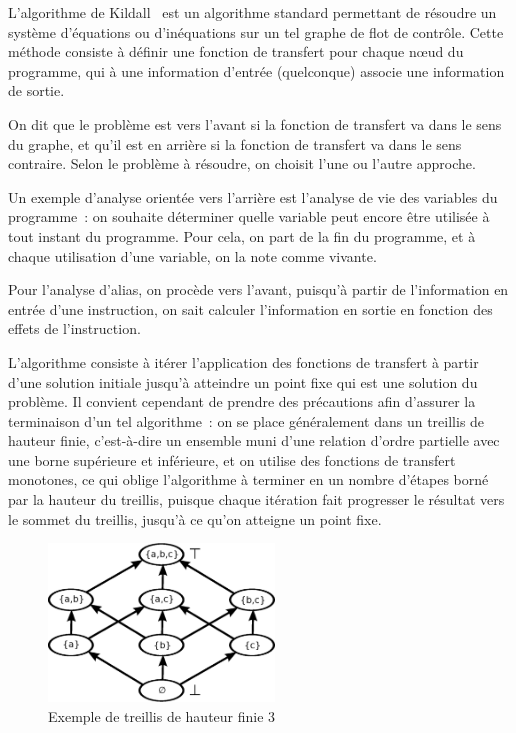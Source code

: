 \documentclass{article}
\begin{document}
L'algorithme de Kildall~\cite{Kildall-73} est un algorithme standard permettant
de résoudre un système d'équations ou d'inéquations sur un tel graphe de flot
de contrôle.  Cette méthode consiste à définir une fonction de transfert pour
chaque nœud du programme, qui à une information d'entrée (quelconque) associe
une information de sortie.

On dit que le problème est vers l'avant si la fonction de transfert va dans le
sens du graphe, et qu'il est en arrière si la fonction de transfert va dans le
sens contraire. Selon le problème à résoudre, on choisit l'une ou l'autre
approche.

Un exemple d'analyse orientée vers l'arrière est l'analyse de vie des variables
du programme~: on souhaite déterminer quelle variable peut encore être utilisée
à tout instant du programme. Pour cela, on part de la fin du programme, et à
chaque utilisation d'une variable, on la note comme vivante.

Pour l'analyse d'alias, on procède vers l'avant, puisqu'à partir de
l'information en entrée d'une instruction, on sait calculer l'information en
sortie en fonction des effets de l'instruction.

L'algorithme consiste à itérer l'application des fonctions de transfert à
partir d'une solution initiale jusqu'à atteindre un point fixe qui est une
solution du problème. Il convient cependant de prendre des précautions afin
d'assurer la terminaison d'un tel algorithme~: on se place généralement dans un
treillis de hauteur finie, c'est-à-dire un ensemble muni d'une relation d'ordre
partielle avec une borne supérieure et inférieure, et on utilise des fonctions
de transfert monotones, ce qui oblige l'algorithme à terminer en un nombre
d'étapes borné par la hauteur du treillis, puisque chaque itération fait
progresser le résultat vers le sommet du treillis, jusqu'à ce qu'on atteigne un
point fixe.

\begin{figure}[ht]
\begin{center}
  \includegraphics[width=6cm]{lattice.eps}
\end{center}
\caption{Exemple de treillis de hauteur finie 3}
\label{lattice}
\end{figure}
\end{document}
